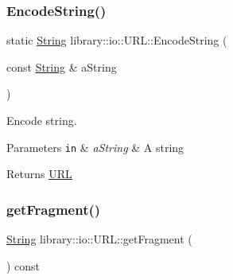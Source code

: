 \subsubsection{\texorpdfstring{Encode\+String()}{EncodeString()}}
{\footnotesize\ttfamily static \hyperlink{namespacelibrary_1_1io_a7469b45835a4421045db344d6a5a1f85}{String} library\+::io\+::\+U\+R\+L\+::\+Encode\+String (\begin{DoxyParamCaption}\item[{const \hyperlink{namespacelibrary_1_1io_a7469b45835a4421045db344d6a5a1f85}{String} \&}]{a\+String }\end{DoxyParamCaption})\hspace{0.3cm}{\ttfamily [static]}}



Encode string. 





\begin{DoxyParams}[1]{Parameters}
\mbox{\tt in}  & {\em a\+String} & A string \\
\hline
\end{DoxyParams}
\begin{DoxyReturn}{Returns}
\hyperlink{classlibrary_1_1io_1_1_u_r_l}{U\+RL} 
\end{DoxyReturn}
\mbox{\label{classlibrary_1_1io_1_1_u_r_l_acf491cea3422f7dc8576fff7431c3a0b}} 
\subsubsection{\texorpdfstring{get\+Fragment()}{getFragment()}}
{\footnotesize\ttfamily \hyperlink{namespacelibrary_1_1io_a7469b45835a4421045db344d6a5a1f85}{String} library\+::io\+::\+U\+R\+L\+::get\+Fragment (\begin{DoxyParamCaption}{ }\end{DoxyParamCaption}) const}



